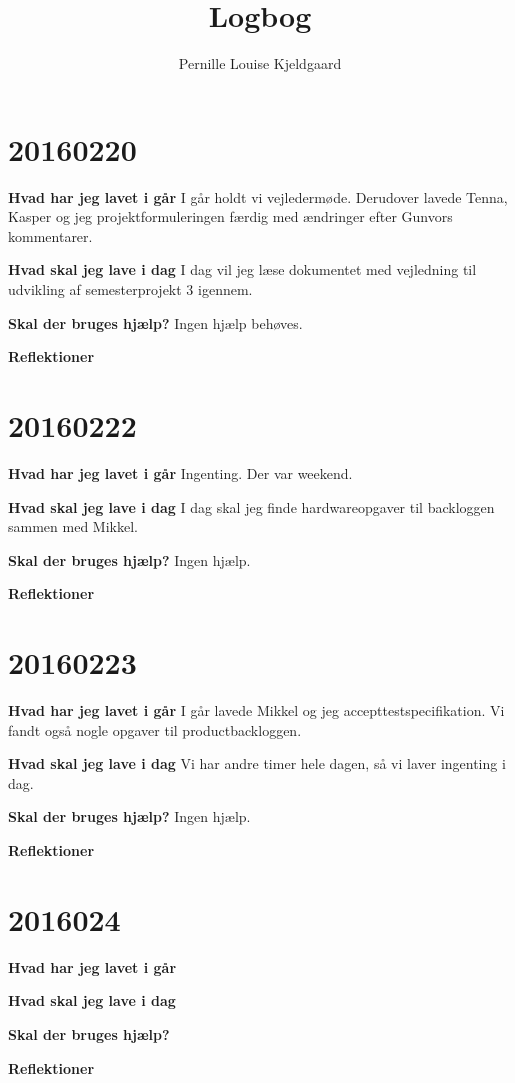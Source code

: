 \documentclass{article}
\title{Logbog}
\author{Pernille Louise Kjeldgaard}
\date{}
\begin{document}
	\maketitle
	\tableofcontents
	
	\section{20160220}
	
	\textbf{Hvad har jeg lavet i går}
	I går holdt vi vejledermøde. Derudover lavede Tenna, Kasper og jeg projektformuleringen færdig med ændringer efter Gunvors kommentarer. 
	
	\textbf{Hvad skal jeg lave i dag}
	I dag vil jeg læse dokumentet med vejledning til udvikling af semesterprojekt 3 igennem. 
	
	\textbf{Skal der bruges hjælp?}
	Ingen hjælp behøves. 
	
	\textbf{Reflektioner}
			
	\section{20160222}
		
	\textbf{Hvad har jeg lavet i går}
	Ingenting. Der var weekend. 
	
	\textbf{Hvad skal jeg lave i dag}
	I dag skal jeg finde hardwareopgaver til backloggen sammen med Mikkel. 
	
	\textbf{Skal der bruges hjælp?}
	Ingen hjælp. 
	
	\textbf{Reflektioner}
	
	\section{20160223}
	
	\textbf{Hvad har jeg lavet i går}
	I går lavede Mikkel og jeg accepttestspecifikation. Vi fandt også nogle opgaver til productbackloggen. 
	
	\textbf{Hvad skal jeg lave i dag}
	Vi har andre timer hele dagen, så vi laver ingenting i dag. 
	
	\textbf{Skal der bruges hjælp?}
	Ingen hjælp. 
	
	\textbf{Reflektioner}
	
	\section{2016024}
	
	\textbf{Hvad har jeg lavet i går}
	 
	
	\textbf{Hvad skal jeg lave i dag}
	 
	
	\textbf{Skal der bruges hjælp?}
	
	
	\textbf{Reflektioner}
	
\end{document}
